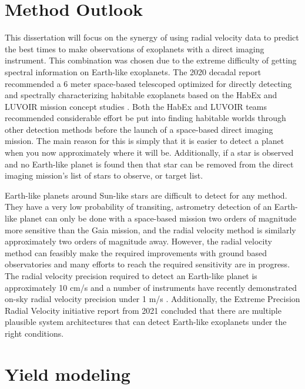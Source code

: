 \section{Method Outlook}
\label{sec:EPRV_HWO}

This dissertation will focus on the synergy of using radial velocity data to
predict the best times to make observations of exoplanets with a direct imaging
instrument. This combination was chosen due to the extreme difficulty of
getting spectral information on Earth-like exoplanets. The 2020 decadal report
recommended a 6 meter space-based telescoped optimized for directly detecting
and spectrally characterizing habitable exoplanets
\citep{nationalacademiesofsciencesPathwaysDiscoveryAstronomy2021} based on the
HabEx and LUVOIR mission concept studies
\citep{gaudiHabitableExoplanetObservatory2020,TheLUVOIRTeam2019}. Both the
HabEx and LUVOIR teams recommended considerable effort be put into finding
habitable worlds through other detection methods before the launch of a
space-based direct imaging mission. The main reason for this is simply that it
is easier to detect a planet when you now approximately where it will be.
Additionally, if a star is observed and no Earth-like planet is found then that
star can be removed from the direct imaging mission's list of stars to observe,
or target list. 

Earth-like planets around Sun-like stars are difficult to detect for any
method. They have a very low probability of transiting, astrometry detection of
an Earth-like planet can only be done with a space-based mission two orders of
magnitude more sensitive than the Gaia mission, and the radial velocity method
is similarly approximately two orders of magnitude
away\citep{gaudiHabitableExoplanetObservatory2020}. However, the radial
velocity method can feasibly make the required improvements with ground based
observatories and many efforts to reach the required sensitivity are in
progress\citep{Fischer2016a}. The radial velocity precision required to detect
an Earth-like planet is approximately 10 cm/s and a number of instruments have
recently demonstrated on-sky radial velocity precision under 1 m/s
\citep{maroonx2021, guptaTargetPrioritization2021,Pepe2021}. Additionally, the
Extreme Precision Radial Velocity initiative report from 2021 concluded that
there are multiple plausible system architectures that can detect Earth-like
exoplanets under the right conditions\citep{Crass2021}.

\section{Yield modeling}
\label{sec:intro_yield_modeling}

